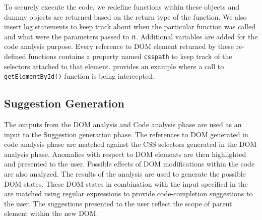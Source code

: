 			To securely execute the \javascript code, we redefine functions within these objects and dummy objects are returned based on the return type of the function. We also insert log statements to keep track about when the particular function was called and what were the parameters passed to it. Additional variables are added for the code analysis purpose. Every reference to DOM element returned by these re-defined functions contains a property named \texttt{csspath} to keep track of the \css selectors attached to that element.  provides an example where a call to \texttt{getElementById()} function is being intercepted.

	
	\subsection{Suggestion Generation}
	\label{Sec:Suggestions}
		
		The outputs from the DOM analysis and Code analysis phase are used as an input to the Suggestion generation phase. The references to DOM generated in code analysis phase are matched against the CSS selectors generated in the DOM analysis phase. Anomalies with respect to DOM elements are then highlighted and presented to the user. Possible effects of DOM modifications within the \javascript code are also analyzed. The results of the analysis are used to generate the possible DOM states. These DOM states in combination with the input specified in the  are matched using regular expressions to provide code-completion suggestions to the user. The suggestions presented to the user reflect the scope of parent element within the new DOM.
		
